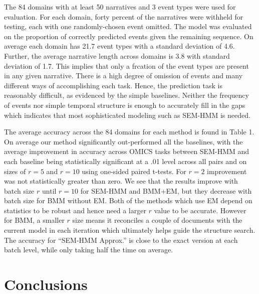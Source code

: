 \documentclass[letterpaper]{article}
\begin{document}
The 84 domains with at least 50 narratives and 3 event types were used for evaluation.
For each domain, forty percent of the narratives were withheld for testing, each with one randomly-chosen event omitted.  The model was evaluated on the proportion of correctly predicted events given the remaining sequence.
On average each domain has 21.7 event types with a standard deviation of 4.6.  Further, the average narrative length across domains is 3.8 with standard deviation of 1.7.  This implies that
only a frcation of the event types are present in any given narrative.
There is a high degree of omission of events and many different ways of accomplishing each task.
Hence, the prediction task is reasonably difficult, as evidenced by the simple baselines.
Neither the frequency of events nor simple temporal structure is enough to accurately fill in the gaps which indicates that most sophisticated modeling such as SEM-HMM is needed.

The average accuracy across the 84 domains for each method is found in Table 1.
On average our method significantly out-performed all the baselines, with the average improvement in accuracy across OMICS tasks between SEM-HMM and each baseline being statistically significant at a .01 level across all pairs and on sizes of $r = 5$ and $r= 10$ using one-sided paired t-tests.  For $r=2$ improvement was not statistically greater than zero. %
We see that the results improve with batch size $r$ until $r=10$ for
SEM-HMM and BMM+EM, but they decrease with batch size for BMM without EM.
Both of the methods which use EM depend on statistics to be robust and hence need a larger $r$ value to be accurate.  However for BMM, a smaller $r$ size means it reconciles a couple of documents with the current model in each iteration which ultimately helps guide the structure search.
The accuracy for ``SEM-HMM Approx.'' is close to the exact version at each batch level, while only taking half the time on average.




\vspace{-0.87mm}
\vspace{-1.46mm}
\section{Conclusions}
\end{document}
